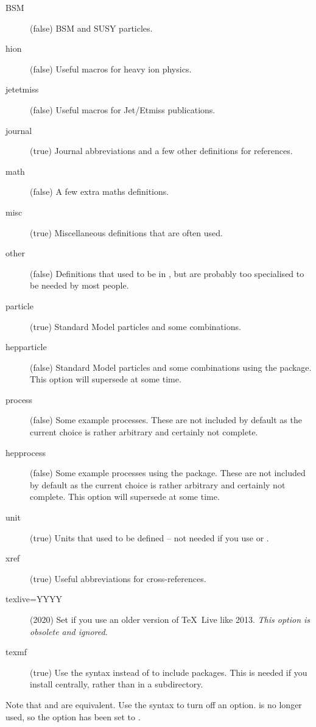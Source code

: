 \begin{description}
\item[BSM](false) BSM and SUSY particles.
\item[hion](false) Useful macros for heavy ion physics.
\item[jetetmiss](false) Useful macros for Jet/Etmiss publications.
\item[journal](true) Journal abbreviations and a few other definitions for references.
\item[math](false) A few extra maths definitions.
\item[misc](true) Miscellaneous definitions that are often used.
\item[other](false) Definitions that used to be in ,
  but are probably too specialised to be needed by most people.
\item[particle](true) Standard Model particles and some combinations.
\item[hepparticle](false) Standard Model particles and some combinations using the  package.
  This option will supersede  at some time.
\item[process](false) Some example processes.
  These are not included by default as the current choice is rather arbitrary
  and certainly not complete.
\item[hepprocess](false) Some example processes using the  package.
  These are not included by default as the current choice is rather arbitrary
  and certainly not complete.
  This option will supersede  at some time.
\item[unit](true) Units that used to be defined -- not needed if you use  or .
\item[xref](true) Useful abbreviations for cross-references.
\item[texlive=YYYY](2020) Set if you use an older version of \TeX\ Live like 2013.
  \emph{ This option is obsolete and ignored.}
\item[texmf](true) Use the syntax 
  instead of  to include packages.
  This is needed if you install  centrally,
  rather than in a  subdirectory.
\end{description}
Note that  and  are equivalent.
Use the syntax  to turn off an option.
  is no longer used,
so the option  has been set to .

